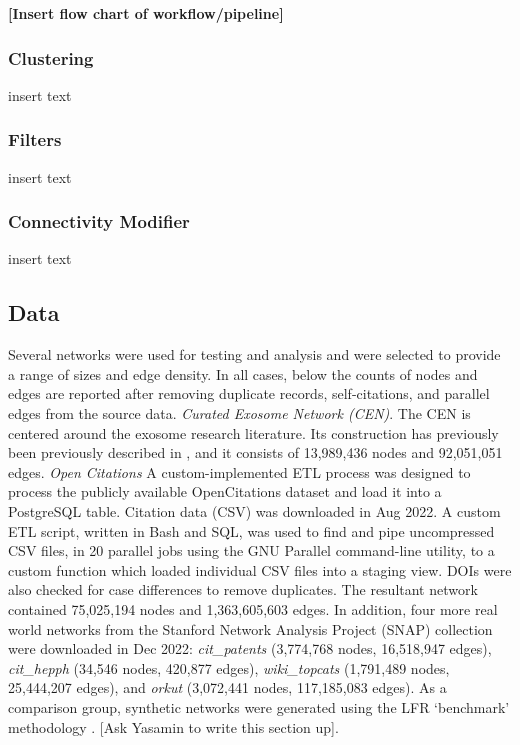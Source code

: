 \documentclass[12pt, oneside]{article}   	%
\begin{document}
\vspace{5 mm}
\textbf{[Insert flow chart of workflow/pipeline]}

\subsubsection{Clustering} insert text
\subsubsection{Filters} insert text
\subsubsection{Connectivity Modifier} insert text 

\subsection{Data} Several networks were used for testing and analysis and were selected to provide a range of sizes and edge density. In all cases, below the counts of nodes and edges are reported after removing duplicate records, 
self-citations, and parallel edges from the source data. \emph{Curated Exosome Network (CEN)}. The CEN is centered around the exosome research literature. Its construction has previously been previously described in \citep{Jakatdar_2022}, and it consists of 13,989,436 nodes and 92,051,051 edges.  \emph{Open Citations} A custom-implemented ETL process was designed to process the publicly available OpenCitations dataset \citep{Peroni2020} and load it into a PostgreSQL table. Citation data (CSV) was downloaded in Aug 2022. A custom ETL script, written in Bash and SQL, was used to find and pipe uncompressed CSV files, in 20 parallel jobs using the GNU Parallel command-line utility, to a custom function which loaded individual CSV files into a staging view. DOIs were also checked for case differences to remove duplicates.  The resultant network contained 75,025,194 nodes and 1,363,605,603 edges.  In addition, four more real world networks from the Stanford Network Analysis Project (SNAP) collection \citep{leskovec2016snap} were downloaded in Dec 2022: \emph{cit\_patents} (3,774,768 nodes, 16,518,947 edges), \emph{cit\_hepph} (34,546 nodes, 420,877 edges), \emph{wiki\_topcats} (1,791,489 nodes, 25,444,207 edges), and \emph{orkut} (3,072,441 nodes, 117,185,083 edges). As a comparison group, synthetic networks were generated using the LFR `benchmark' methodology \citep{Lancichinetti2008}. [Ask Yasamin to write this section up].
\end{document}
